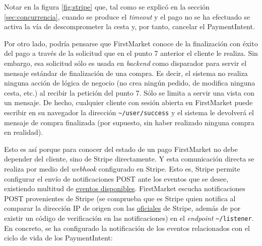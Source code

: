 \documentclass[a4paper,12pt,twoside,openright]{report}
\begin{document}
    Notar en la figura \ref{fig:stripe} que, tal como se explicó en la sección \ref{sec:concurrencia}, cuando se produce el \emph{timeout} y el pago no se ha efectuado se activa la vía de descomprometer la cesta y, por tanto, cancelar el PaymentIntent.
    
    Por otro lado, podría pensarse que FirstMarket conoce de la finalización con éxito del pago a través de la solicitud que en el punto 7 anterior el cliente le realiza. Sin embargo, esa solicitud sólo es usada en \emph{backend} como disparador para servir el mensaje estándar de finalización de una compra. Es decir, el sistema no realiza ninguna acción de lógica de negocio (no crea ningún pedido, de modifica ninguna cesta, etc.) al recibir la petición del punto 7. Sólo se limita a servir una vista con un mensaje. De hecho, cualquier cliente con sesión abierta en FirstMarket puede escribir en su navegador la dirección \nolinkurl{~/user/success} y el sistema le devolverá el mensaje de compra finalizada (por supuesto, sin haber realizado ninguna compra en realidad).
    
    Esto es así porque para conocer del estado de un pago FirstMarket no debe depender del cliente, sino de Stripe directamente. Y esta comunicación directa se realiza por medio del \emph{webhook} configurado en Stripe. Esto es, Stripe permite configurar el envío de notificaciones POST ante los eventos que se desee, existiendo multitud de \href{https://stripe.com/docs/api/events/types}{eventos disponibles}. FirstMarket escucha notificaciones POST provenientes de Stripe (se comprueba que es Stripe quien notifica al comparar la dirección IP de origen con las \href{https://stripe.com/docs/ips}{oficiales} de Stripe, además de por existir un código de verificación en las notificaciones) en el \emph{endpoint} \nolinkurl{~/listener}. En concreto, se ha configurado la notificación de los eventos relacionados con el ciclo de vida de los PaymentIntent:
    
\end{document}
